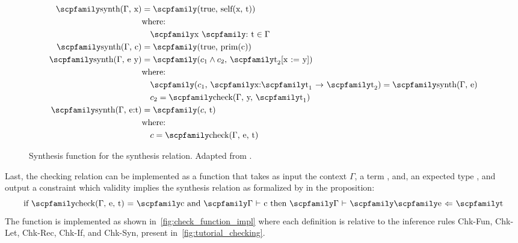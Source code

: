 \documentclass[
  oneside,
  english,
  coorientadorbanca,
  noabntexcite
]{ufsc-thesis-rn46-2019}
\newcommand{\codett}[1]{\text{\scpfamily#1}}
\newcommand{\code}[1]{\text{\scpfamily\setlength\spaceskip{0.35em}#1}}
\newcommand{\typer}[2]{\code{#1 \codett{:} #2}}
\newcommand{\ctxtr}[2]{\code{{$\Gamma$}#1 {$\vdash$} #2}}
\newcommand{\checkr}[2]{\code{#1 $\Leftarrow$ #2}}
\newcommand{\checkcxr}[3]{\ctxtr{#1}{\checkr{#2}{#3}}}
\newcommand{\fnty}[2]{\code{#1 $\rightarrow$ #2}}
\begin{document}
\begin{figure}[ht]
  \begin{align*}
    \code{synth($\Gamma$, x)}
     & = \code{(true, self(x, t))}                                                           \\
     & \textrm{where:}                                                                       \\
     & \quad \typer{x}{t} \in \Gamma                                                         \\
    \code{synth($\Gamma$, c)}
     & = \code{(true, prim(c))}                                                              \\
    \code{synth($\Gamma$, e y)}
     & = \code{($c_1 \land c_2$, $\code{t}_2$[x := y])}                                      \\
     & \textrm{where:}                                                                       \\
     & \quad \code{($c_1$, \fnty{x:$\code{t}_1$}{$\code{t}_2$})} = \code{synth($\Gamma$, e)} \\
     & \quad c_2 = \code{check($\Gamma$, y, $\code{t}_1$)}                                   \\
    \code{synth($\Gamma$, e:t)}
     & = \code{($c$, t)}                                                                     \\
     & \textrm{where:}                                                                       \\
     & \quad c = \code{check($\Gamma$, e, t)}
  \end{align*}
  \caption{
    Synthesis function for the synthesis relation.
    Adapted from \textcite{jhala2020tutorial}.
  }\label{fig:synth_function_impl}
\end{figure}

Last, the checking relation can be implemented as a function \code{check} that takes as input the context $\Gamma$, a term \code{e}, and, an expected type \code{t}, and output a constraint \code{c} which validity implies the synthesis relation as formalized by \textcite{jhala2020tutorial} in the proposition:
\begin{equation*}
  \textrm{if \code{check($\Gamma$, e, t)} = \code{c} and \ctxtr{}{c} then \checkcxr{}{\code{e}}{\code{t}}}
\end{equation*}
The function \code{check} is implemented as shown in~\cref{fig:check_function_impl} where each definition is relative to the inference rules Chk-Fun, Chk-Let, Chk-Rec, Chk-If, and Chk-Syn, present in~\cref{fig:tutorial_checking}.
\end{document}
